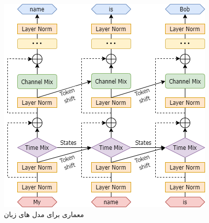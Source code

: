 \begin{figure}[!htb]
  \centering
  \includegraphics[scale=1]{Figures/RWKV-arch.png}
  \caption{معماری  برای مدل های زبان
  }
  \label{Fig:RWKV}
\end{figure}

